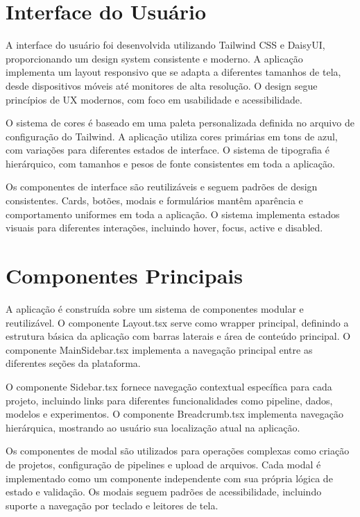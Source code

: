\documentclass[12pt,a4paper]{article}
\begin{document}
\section{Interface do Usuário}

A interface do usuário foi desenvolvida utilizando Tailwind CSS e DaisyUI, proporcionando um design system consistente e moderno. A aplicação implementa um layout responsivo que se adapta a diferentes tamanhos de tela, desde dispositivos móveis até monitores de alta resolução. O design segue princípios de UX modernos, com foco em usabilidade e acessibilidade.

O sistema de cores é baseado em uma paleta personalizada definida no arquivo de configuração do Tailwind. A aplicação utiliza cores primárias em tons de azul, com variações para diferentes estados de interface. O sistema de tipografia é hierárquico, com tamanhos e pesos de fonte consistentes em toda a aplicação.

Os componentes de interface são reutilizáveis e seguem padrões de design consistentes. Cards, botões, modais e formulários mantêm aparência e comportamento uniformes em toda a aplicação. O sistema implementa estados visuais para diferentes interações, incluindo hover, focus, active e disabled.

\section{Componentes Principais}

A aplicação é construída sobre um sistema de componentes modular e reutilizável. O componente Layout.tsx serve como wrapper principal, definindo a estrutura básica da aplicação com barras laterais e área de conteúdo principal. O componente MainSidebar.tsx implementa a navegação principal entre as diferentes seções da plataforma.

O componente Sidebar.tsx fornece navegação contextual específica para cada projeto, incluindo links para diferentes funcionalidades como pipeline, dados, modelos e experimentos. O componente Breadcrumb.tsx implementa navegação hierárquica, mostrando ao usuário sua localização atual na aplicação.

Os componentes de modal são utilizados para operações complexas como criação de projetos, configuração de pipelines e upload de arquivos. Cada modal é implementado como um componente independente com sua própria lógica de estado e validação. Os modais seguem padrões de acessibilidade, incluindo suporte a navegação por teclado e leitores de tela.
\end{document}
